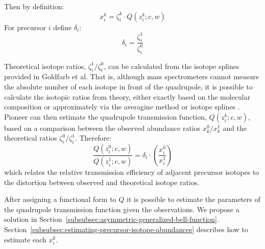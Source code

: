 \documentclass[pdflatex,sn-nature]{sn-jnl}
\begin{document}
Then by definition:
\begin{equation}
    x_i^{k} = \zeta_{i}^{k} \cdot Q(z_{i}^{k}; c, w)
\end{equation}
For precursor $i$ define $\delta_{i}$: 
\begin{equation}
    \delta_{i} = \frac{\zeta_{i}^{1}}{\zeta_{i}^{0}} 
\end{equation}

Theoretical isotope ratios, $\zeta_{i}^{1}/\zeta_{i}^{0}$, can be calculated from the isotope splines provided in Goldfarb et al. That is, although mass spectrometers cannot measure the absolute number of each isotope in front of the quadrupole, it is possible to calculate the isotopic ratios from theory, either exactly based on the molecular composition or approximately via the averagine method or isotope splines \cite{Goldfarb2018-ai}. Pioneer can then estimate the quadrupole transmission function, $Q(z_i^{k}; c, w)$, based on a comparison between the observed abundance ratios $x_{k}^{0}/x_{k}^{1}$ and the theoretical ratios $\zeta_i^{0}/\zeta_i^{1}$. Therefore:
\begin{equation}
\frac{Q(z_{i}^{0}; c, w)}{Q(z_{i}^{1}; c, w)} = \delta_{i} \cdot \left(\frac{x_{i}^{0}}{x_{i}^{1}}\right)
\end{equation}\label{eq:quadrupole-ratio}
which relates the relative transmission efficiency of adjacent precursor isotopes to the distortion between observed and theoretical isotope ratios.

After assigning a functional form to $Q$ it is possible to estimate the parameters of the quadrupole transmission function given the observations. We propose a solution in Section~\ref{subsubsec:asymmetric-generalized-bell-function}. Section~\ref{subsubsec:estimating-precursor-isotope-abundances} describes how to estimate each $x_{i}^{k}$.  


\end{document}

